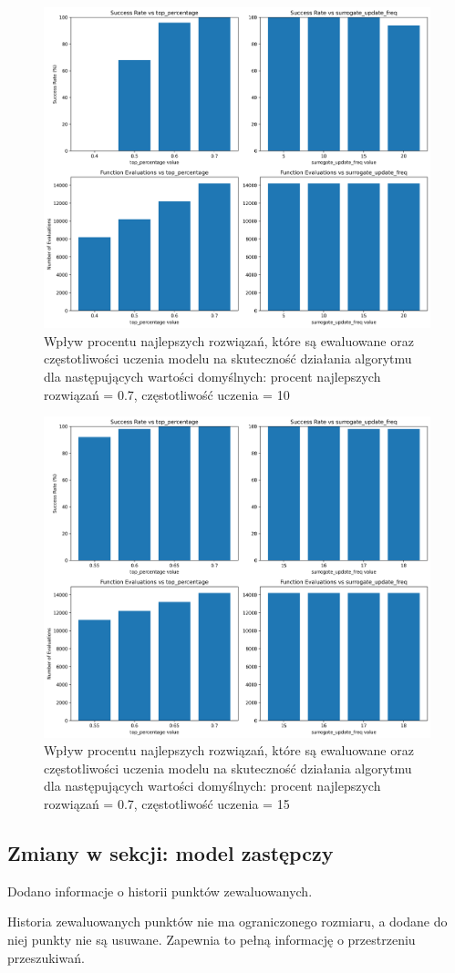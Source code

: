 \documentclass{article}
\begin{document}
\begin{figure}[H]
    \centering
    \includegraphics[width=\textwidth]{surrogate_de_parameter_tuning_results2.png}
    \caption{Wpływ procentu najlepszych rozwiązań, które są ewaluowane oraz częstotliwości uczenia modelu na skuteczność działania algorytmu dla następujących wartości domyślnych: procent najlepszych rozwiązań = 0.7, częstotliwość uczenia = 10}
    \label{fig:surogate_de_parameter_results2}
\end{figure}

\begin{figure}[H]
    \centering
    \includegraphics[width=\textwidth]{surrogate_de_parameter_tuning_results3.png}
    \caption{Wpływ procentu najlepszych rozwiązań, które są ewaluowane oraz częstotliwości uczenia modelu na skuteczność działania algorytmu dla następujących wartości domyślnych: procent najlepszych rozwiązań = 0.7, częstotliwość uczenia = 15}
    \label{fig:surogate_de_parameter_results3}
\end{figure}


\subsection{Zmiany w sekcji: model zastępczy}

Dodano informacje o historii punktów zewaluowanych.

Historia zewaluowanych punktów nie ma ograniczonego rozmiaru, a dodane do niej punkty nie są usuwane. Zapewnia to pełną informację o przestrzeniu przeszukiwań.
\end{document}
